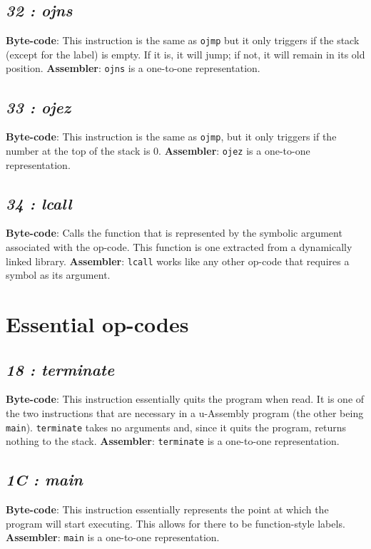 \documentclass[12pt]{report}
\begin{document}
  \subsection{\emph{32 : ojns}}
  \textbf{Byte-code}: This instruction is the same as \verb|ojmp| but it only triggers
  if the stack (except for the label) is empty.  If it is, it will jump; if not, it
  will remain in its old position.\newline
  \textbf{Assembler}: \verb|ojns| is a one-to-one representation.
  \subsection{\emph{33 : ojez}}
  \textbf{Byte-code}: This instruction is the same as \verb|ojmp|, but it only triggers
  if the number at the top of the stack is 0.\newline
  \textbf{Assembler}: \verb|ojez| is a one-to-one representation.
  \subsection{\emph{34 : lcall}}
  \textbf{Byte-code}: Calls the function that is represented by the symbolic argument
  associated with the op-code.  This function is one extracted from a dynamically
  linked library.\newline
  \textbf{Assembler}: \verb|lcall| works like any other op-code that requires
  a symbol as its argument.

  \section{Essential op-codes}
  \subsection{\emph{18 : terminate}}
  \textbf{Byte-code}: This instruction essentially quits the program when read.  It
  is one of the two instructions that are necessary in a u-Assembly program (the
  other being \verb|main|).  \verb|terminate| takes no arguments and, since it quits
  the program, returns nothing to the stack.\newline
  \textbf{Assembler}: \verb|terminate| is a one-to-one representation.
  \subsection{\emph{1C : main}}
  \textbf{Byte-code}: This instruction essentially represents the point at which the
  program will start executing.  This allows for there to be function-style labels.
  \newline
  \textbf{Assembler}: \verb|main| is a one-to-one representation.
\end{document}
